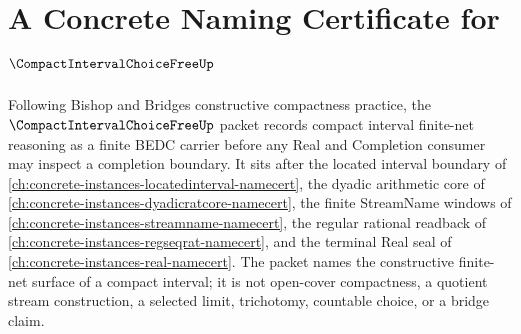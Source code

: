 \chapter{A Concrete Naming Certificate for $\CompactIntervalChoiceFreeUp$}
\label{ch:concrete-instances-compact-interval-choice-free-namecert}

Following Bishop and Bridges constructive compactness practice, the $\CompactIntervalChoiceFreeUp$ packet records compact interval finite-net reasoning as a finite BEDC carrier before any Real and Completion consumer may inspect a completion boundary. It sits after the located interval boundary of \autoref{ch:concrete-instances-locatedinterval-namecert}, the dyadic arithmetic core of \autoref{ch:concrete-instances-dyadicratcore-namecert}, the finite StreamName windows of \autoref{ch:concrete-instances-streamname-namecert}, the regular rational readback of \autoref{ch:concrete-instances-regseqrat-namecert}, and the terminal Real seal of \autoref{ch:concrete-instances-real-namecert}. The packet names the constructive finite-net surface of a compact interval; it is not open-cover compactness, a quotient stream construction, a selected limit, trichotomy, countable choice, or a bridge claim.

